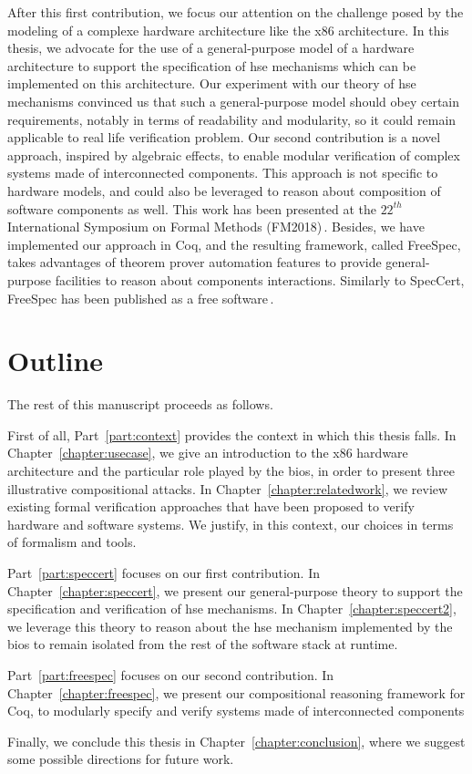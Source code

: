 After this first contribution, we focus our attention on the challenge posed by
the modeling of a complexe hardware architecture like the x86 architecture.
%
In this thesis, we advocate for the use of a general-purpose model of a hardware
architecture to support the specification of \ac{hse} mechanisms which can be
implemented on this architecture.
%
Our experiment with our theory of \ac{hse} mechanisms convinced us that such a
general-purpose model should obey certain requirements, notably in terms of
readability and modularity, so it could remain applicable to real life
verification problem.
%
Our second contribution is a novel approach, inspired by algebraic effects, to
enable modular verification of complex systems made of interconnected
components.
%
This approach is not specific to hardware models, and could also be leveraged to
reason about composition of software components as well.
%
This work has been presented at the $22^{th}$ International Symposium on Formal
Methods (FM2018)\,\cite{letan2018freespec}.
%
Besides, we have implemented our approach in Coq, and the resulting framework,
called FreeSpec, takes advantages of theorem prover automation features to
provide general-purpose facilities to reason about components interactions.
%
Similarly to SpecCert, FreeSpec has been published as a free
software\,\cite{letan2018freespeccode}.

\section{Outline}

The rest of this manuscript proceeds as follows.

First of all, Part~\ref{part:context} provides the context in which this thesis
falls.
%
In Chapter~\ref{chapter:usecase}, we give an introduction to the x86 hardware
architecture and the particular role played by the \ac{bios}, in order to
present three illustrative compositional attacks.
%
In Chapter~\ref{chapter:relatedwork}, we review existing formal verification
approaches that have been proposed to verify hardware and software systems.
%
We justify, in this context, our choices in terms of formalism and tools.

Part~\ref{part:speccert} focuses on our first contribution.
%
In Chapter~\ref{chapter:speccert}, we present our general-purpose theory to
support the specification and verification of \ac{hse} mechanisms.
%
In Chapter~\ref{chapter:speccert2}, we leverage this theory to reason about
the \ac{hse} mechanism implemented by the \ac{bios} to remain isolated from the
rest of the software stack at runtime.

Part~\ref{part:freespec} focuses on our second contribution.
%
In Chapter~\ref{chapter:freespec}, we present our compositional reasoning
framework for Coq, to modularly specify and verify systems made of
interconnected components

Finally, we conclude this thesis in Chapter~\ref{chapter:conclusion}, where we
suggest some possible directions for future work.
